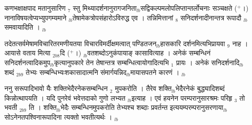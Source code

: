\documentclass[article,12pt,a4paper]{memoir}%
\newcommand{\add}[1]{($^{+}$#1)}
\newcounter{parCount}
\begin{document}
{\color{DodgerBlue3}कणभक्षाक्षपाद} मतानुसारिण {\tiny $_{7}$} स्तु मिथ्यादर्शनानुरागजनिता{\tiny $_{lb}$}सद्विकल्पमलोपलिप्तान्तर्लोचनाः सञ्चक्षते \add{।} नानाविषयत्वेप्यभ्युपगम्यमाने {\tiny $_{lb}$}तेषामेकत्रोपसंहारोऽविरुद्ध एव । तन्निमित्तानां {\tiny $_{8}$} सनिदर्शनादीनान्तत्र रूपादौ {\tiny $_{lb}$}समवायादिति ।
	{}
	\pend%
      {\tiny $_{lb}$}

	  
	  \pstart \leavevmode%
	तदेतत्सर्वमेषामविचारितरमणीयतया विचारविमर्दीक्षमत्वात् पण्डितजन{\tiny $_{lb}$}हासकारि दर्शनमित्यभिप्रायवा {\tiny $_{9}$} \leavevmode{} नाह । {\color{DodgerBlue3}आयासे वताय} मित्या {\tiny $_{2b8}$}दि \add{।} {\tiny $_{lb}$}वतशब्दोऽनुकंपायाङ् कासावित्याह । {\color{DodgerBlue3}अनेकं सम्बन्धिनं} सनिदर्शनत्वादिकमुप{\tiny $_{lb}$}कृत्यानुपकारे तेन तेषान्तत्र सम्बन्धित्वायोगादित्यभि {\tiny $_{1}$} प्रायः । अनेकं सनिदर्शनादि{\tiny $_{lb}$} {\color{DodgerBlue3}शब्दं} {\tiny $_{2b9}$} तेभ्यः सम्बन्धिभ्यःशकासादात्मनि संमार्गयन्निद{\tiny $_{lb}$}मायासपतने कारणं ।
	{}
	\pend%
      {\tiny $_{lb}$}

	  
	  \pstart \leavevmode%
	ननु सरूपादिभावो यैः शक्तिभेदैरनेकसम्बन्धिन {\tiny $_{2}$} मुपकरोति । तैरेव शक्ति{\tiny $_{lb}$}भेदैरनेकं बुद्ध्यादिशब्दं किन्नोत्थापयति । यदि पुनरेवं भवेत्तदाको गुणो लभ्यत {\tiny $_{lb}$}इत्याह । {\color{DodgerBlue3}एवं हयनेन परम्परानुसारश्रमः परिहृ {\tiny $_{3}$} तो भवती} {\tiny $_{2b9}$} ति । शक्ति{\tiny $_{lb}$}भेदैः सम्बन्धिनमुपकरोति तेभ्यश्च शब्दाः प्रवर्तन्त इत्ययम्परम्परानुसरणाया{\tiny $_{lb}$}सोऽनेनतपश्विनारूपादिना त्यक्तो भवतीत्यर्थः । 
	{}
	\pend%
      {\tiny $_{lb}$}
\end{document}
